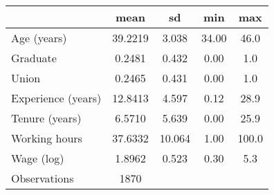 {
\def\sym#1{\ifmmode^{#1}\else\(^{#1}\)\fi}
\begin{tabular}{l*{1}{cccc}}
\hline\hline
                    &        mean&          sd&         min&         max\\
\hline
Age (years)         &     39.2219&       3.038&       34.00&        46.0\\
Graduate            &      0.2481&       0.432&        0.00&         1.0\\
Union               &      0.2465&       0.431&        0.00&         1.0\\
Experience (years)  &     12.8413&       4.597&        0.12&        28.9\\
Tenure (years)      &      6.5710&       5.639&        0.00&        25.9\\
Working hours       &     37.6332&      10.064&        1.00&       100.0\\
Wage (log)          &      1.8962&       0.523&        0.30&         5.3\\
\hline
Observations        &        1870&            &            &            \\
\hline\hline
\end{tabular}
}
